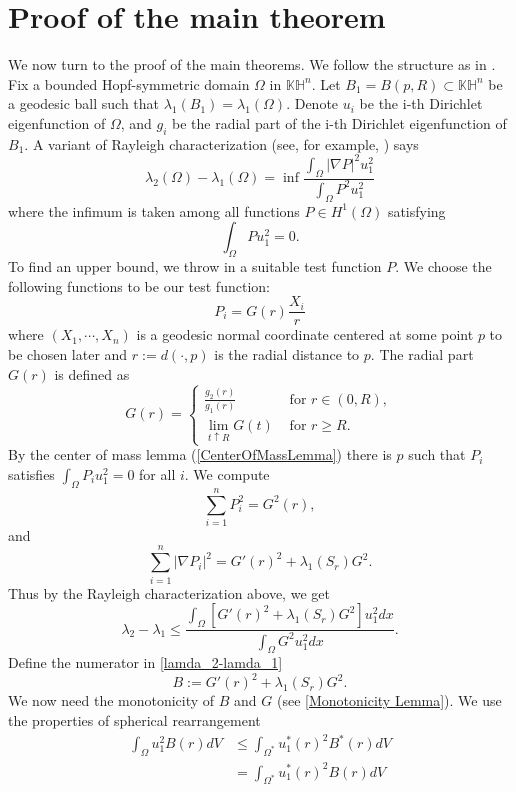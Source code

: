 \documentclass{amsart}
\numberwithin{equation}{section}
\theoremstyle{plain}
\theoremstyle{definition}
\theoremstyle{remark}
\def\KK {\mathbb{K}}
\def\HH {\mathbb{H}}
\begin{document}
\section{Proof of the main theorem}\label{section: Main thoerem proof}
We now turn to the proof of the main theorems. We follow the structure as in \cite[Section 5]{benguria2007second}. Fix a bounded Hopf-symmetric domain $\Omega$ in $\KK\HH^n$. Let $B_1= B(p, R)\subset \KK\HH^n$ be a geodesic ball such that $\lambda_1(B_1)=\lambda_1(\Omega)$. Denote $u_i$ be the i-th Dirichlet eigenfunction of $\Omega$, and $g_i$ be the radial part of the i-th Dirichlet eigenfunction of $B_1$. A variant of Rayleigh characterization (see, for example, \cite[Section 2.4]{miker2009eigenvalue}) says
\[\lambda_2(\Omega)-\lambda_1(\Omega) = \inf \frac{\int_{\Omega}|\nabla P|^2 u_1^2 }{\int_{\Omega} P^2 u_1^2} \]
 where the infimum is taken among all functions $P \in H^1(\Omega)$ satisfying
 \[\int_{\Omega} P u_1^2 =0.\]
To find an upper bound, we throw in a suitable test function $P$. We choose the following functions to be our test function:
\[P_i= G(r)\frac{X_i}{r}\] where $(X_1,\cdots,X_n)$ is a geodesic normal coordinate centered at some point $p$ to be chosen later and $r:= d(\cdot,p)$ is the radial distance to $p$. The radial part $G(r)$ is defined as 
\[G(r)= \begin{cases}\frac{g_2(r)}{g_1(r)} & \text { for } r \in(0, R), \\ \lim _{t \uparrow R} G(t) & \text { for } r \geq R .\end{cases}\]
By the center of mass lemma (\cref{CenterOfMassLemma}) there is $p$ such that $P_i$ satisfies $\int_{\Omega} P_i u_1^2 =0$ for all $i$. We compute 
\[\sum_{i=1}^n P_i^2=G^2(r),\] and 
\[\sum_{i=1}^n|\nabla P_i|^2 = G'(r)^2+\lambda_1(S_r)G^2.\] Thus by the Rayleigh characterization above, we get
\begin{equation}\label{lamda_2-lamda_1}
                \lambda_2-\lambda_1 \leq \frac{\int_{\Omega}\left[ G'(r)^2+\lambda_1(S_r)G^2  \right] u_1^2 d x}{\int_{\Omega} G^2 u_1^2 d x}.
\end{equation}
Define the numerator in \cref{lamda_2-lamda_1}\[B := G'(r)^2+\lambda_1(S_r)G^2. \]
We now need the monotonicity of $B$ and $G$ (see \cref{Monotonicity Lemma}). We use the properties of spherical rearrangement 
\[\begin{aligned}
            \int_{\Omega} u_1^2 B(r) d V & \leq \int_{\Omega^*} u_1^*(r)^2 B^*(r) d V \\
            & = \int_{\Omega^*} u_1^*(r)^2 B(r) d V
            \end{aligned}\] 
\end{document}
